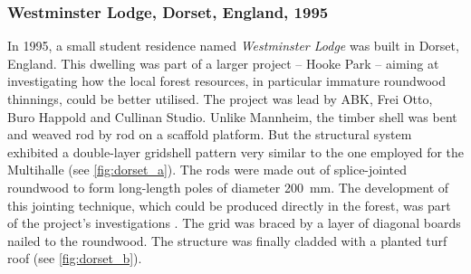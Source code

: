 \subsubsection{Westminster Lodge, Dorset, England, 1995}
In 1995, a small student residence named \emph{Westminster Lodge} was built in Dorset, England. This dwelling was part of a larger project -- Hooke Park -- aiming at investigating how the local forest resources, in particular immature roundwood thinnings, could be better utilised. The project was lead by ABK, Frei Otto, Buro Happold and Cullinan Studio. Unlike Mannheim, the timber shell was bent and weaved rod by rod on a scaffold platform. But the structural system exhibited a double-layer gridshell pattern very similar to the one employed for the Multihalle (see \cref{fig:dorset_a}). The rods were made out of splice-jointed roundwood to form long-length poles of diameter \SI{200}{mm}. The development of this jointing technique, which could be produced directly in the forest, was part of the project's investigations \cite{Burton1998}. The grid was braced by a layer of diagonal boards nailed to the roundwood. The structure was finally cladded with a planted turf roof (see \cref{fig:dorset_b}).

